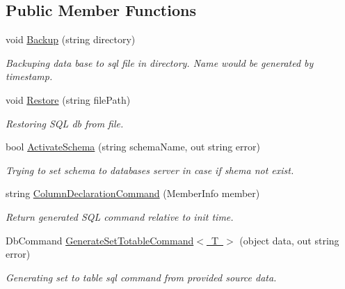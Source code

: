\subsection*{Public Member Functions}
\begin{DoxyCompactItemize}
\item 
void \mbox{\hyperlink{class_uniform_data_operator_1_1_sql_1_1_my_sql_1_1_my_sql_data_operator_a0dbd58206733a17dd26143b58d0859d7}{Backup}} (string directory)
\begin{DoxyCompactList}\small\item\em Backuping data base to sql file in directory. Name would be generated by timestamp. \end{DoxyCompactList}\item 
void \mbox{\hyperlink{class_uniform_data_operator_1_1_sql_1_1_my_sql_1_1_my_sql_data_operator_a22a9e92989ebdb3a52b8ebe409c59831}{Restore}} (string file\+Path)
\begin{DoxyCompactList}\small\item\em Restoring S\+QL db from file. \end{DoxyCompactList}\item 
bool \mbox{\hyperlink{class_uniform_data_operator_1_1_sql_1_1_my_sql_1_1_my_sql_data_operator_a2ed7d06bc016ae6d07cbcceffc21bbd3}{Activate\+Schema}} (string schema\+Name, out string error)
\begin{DoxyCompactList}\small\item\em Trying to set schema to databases server in case if shema not exist. \end{DoxyCompactList}\item 
string \mbox{\hyperlink{class_uniform_data_operator_1_1_sql_1_1_my_sql_1_1_my_sql_data_operator_a0bdc2943e5d10576fb564913cdd744e7}{Column\+Declaration\+Command}} (Member\+Info member)
\begin{DoxyCompactList}\small\item\em Return generated S\+QL command relative to init time. \end{DoxyCompactList}\item 
Db\+Command \mbox{\hyperlink{class_uniform_data_operator_1_1_sql_1_1_my_sql_1_1_my_sql_data_operator_aafd50d73bfdb7cebf3631b2ecac36b80}{Generate\+Set\+Totable\+Command$<$ T $>$}} (object data, out string error)
\begin{DoxyCompactList}\small\item\em Generating set to table sql command from provided source data. \end{DoxyCompactList}\item 

\end{DoxyCompactItemize}
